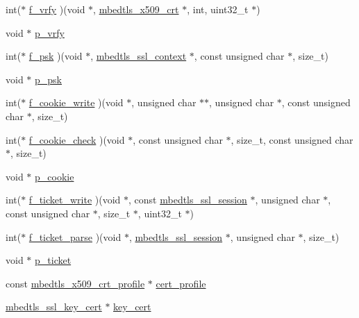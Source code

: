 \begin{DoxyCompactItemize}
\item 
int($\ast$ \hyperlink{structmbedtls__ssl__config_adbb2dc3740e0f1d726f8e9ff026b6d11}{f\-\_\-vrfy} )(void $\ast$, \hyperlink{structmbedtls__x509__crt}{mbedtls\-\_\-x509\-\_\-crt} $\ast$, int, uint32\-\_\-t $\ast$)
\item 
void $\ast$ \hyperlink{structmbedtls__ssl__config_ac59c71efac4d612c645e703941efae51}{p\-\_\-vrfy}
\item 
int($\ast$ \hyperlink{structmbedtls__ssl__config_aa910c0bbe6ec2a3787196faaef2e5ac3}{f\-\_\-psk} )(void $\ast$, \hyperlink{structmbedtls__ssl__context}{mbedtls\-\_\-ssl\-\_\-context} $\ast$, const unsigned char $\ast$, size\-\_\-t)
\item 
void $\ast$ \hyperlink{structmbedtls__ssl__config_ad42f2396c9758b6866d61342094a0a7d}{p\-\_\-psk}
\item 
int($\ast$ \hyperlink{structmbedtls__ssl__config_a24ad512d14251faef692f9692acab21c}{f\-\_\-cookie\-\_\-write} )(void $\ast$, unsigned char $\ast$$\ast$, unsigned char $\ast$, const unsigned char $\ast$, size\-\_\-t)
\item 
int($\ast$ \hyperlink{structmbedtls__ssl__config_a2a992d43e5f3215b07533dd6cacf5de4}{f\-\_\-cookie\-\_\-check} )(void $\ast$, const unsigned char $\ast$, size\-\_\-t, const unsigned char $\ast$, size\-\_\-t)
\item 
void $\ast$ \hyperlink{structmbedtls__ssl__config_a227d50ad74b96adcc59a8fdee0f618a4}{p\-\_\-cookie}
\item 
int($\ast$ \hyperlink{structmbedtls__ssl__config_aea65bf00504dd75984afa3b91e90b8f0}{f\-\_\-ticket\-\_\-write} )(void $\ast$, const \hyperlink{structmbedtls__ssl__session}{mbedtls\-\_\-ssl\-\_\-session} $\ast$, unsigned char $\ast$, const unsigned char $\ast$, size\-\_\-t $\ast$, uint32\-\_\-t $\ast$)
\item 
int($\ast$ \hyperlink{structmbedtls__ssl__config_a8524cfef06d1e707603437926a487089}{f\-\_\-ticket\-\_\-parse} )(void $\ast$, \hyperlink{structmbedtls__ssl__session}{mbedtls\-\_\-ssl\-\_\-session} $\ast$, unsigned char $\ast$, size\-\_\-t)
\item 
void $\ast$ \hyperlink{structmbedtls__ssl__config_a0dab7f9f4f2c85644ebe32f8e37984dc}{p\-\_\-ticket}
\item 
const \hyperlink{structmbedtls__x509__crt__profile}{mbedtls\-\_\-x509\-\_\-crt\-\_\-profile} $\ast$ \hyperlink{structmbedtls__ssl__config_a72c287eeb318ef4975b28619d0413419}{cert\-\_\-profile}
\item 
\hyperlink{structmbedtls__ssl__key__cert}{mbedtls\-\_\-ssl\-\_\-key\-\_\-cert} $\ast$ \hyperlink{structmbedtls__ssl__config_afbcfe1cdb3e42ee1d1e14352cefde29e}{key\-\_\-cert}
$$
\end{DoxyCompactItemize}
